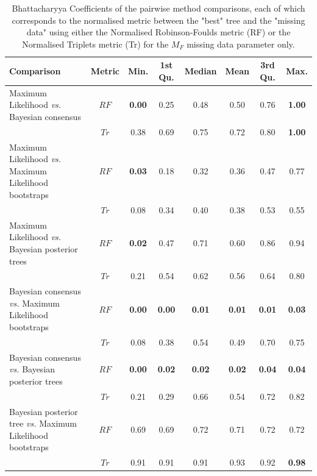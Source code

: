 \documentclass[12pt,letterpaper]{article}
\begin{document}
\begin{landscape}
\begin{table}[ht]
\caption{Bhattacharyya Coefficients of the pairwise method comparisons, each of which corresponds to the normalised metric between the "best" tree and the "missing data" using either the Normalised Robinson-Foulds metric (RF) or the Normalised Triplets metric (Tr) for the $M_{F}$ missing data parameter only.}
\label{Tab_Supp_summary_BC_MF}
\centering
\begin{tabular}{lccccccc}
  \hline
 Comparison &  Metric & Min. & 1st Qu. & Median & Mean & 3rd Qu. & Max. \\  
  \hline
    Maximum Likelihood \textit{vs.} Bayesian consensus                 & $RF$ & \textbf{0.00} & 0.25 & 0.48 & 0.50 & 0.76 & \textbf{1.00} \\ 
                                                                       & $Tr$ & 0.38 & 0.69 & 0.75 & 0.72 & 0.80 & \textbf{1.00} \\ 
    Maximum Likelihood \textit{vs.} Maximum Likelihood bootstraps      & $RF$ & \textbf{0.03} & 0.18 & 0.32 & 0.36 & 0.47 & 0.77 \\ 
                                                                       & $Tr$ & 0.08 & 0.34 & 0.40 & 0.38 & 0.53 & 0.55 \\ 
    Maximum Likelihood \textit{vs.} Bayesian posterior trees           & $RF$ & \textbf{0.02} & 0.47 & 0.71 & 0.60 & 0.86 & 0.94 \\ 
                                                                       & $Tr$ & 0.21 & 0.54 & 0.62 & 0.56 & 0.64 & 0.80 \\ 
    Bayesian consensus \textit{vs.} Maximum Likelihood bootstraps      & $RF$ & \textbf{0.00} & \textbf{0.00} & \textbf{0.01} & \textbf{0.01} & \textbf{0.01} & \textbf{0.03} \\ 
                                                                       & $Tr$ & 0.08 & 0.38 & 0.54 & 0.49 & 0.70 & 0.75 \\ 
    Bayesian consensus \textit{vs.} Bayesian posterior trees           & $RF$ & \textbf{0.00} & \textbf{0.02} & \textbf{0.02} & \textbf{0.02} & \textbf{0.04} & \textbf{0.04} \\ 
                                                                       & $Tr$ & 0.21 & 0.29 & 0.66 & 0.54 & 0.72 & 0.82 \\ 
    Bayesian posterior tree \textit{vs.} Maximum Likelihood bootstraps & $RF$ & 0.69 & 0.69 & 0.72 & 0.71 & 0.72 & 0.72 \\ 
                                                                       & $Tr$ & 0.91 & 0.91 & 0.91 & 0.93 & 0.92 & \textbf{0.98} \\ 
   \hline
\end{tabular}
\end{table}
\end{landscape}
\end{document}
